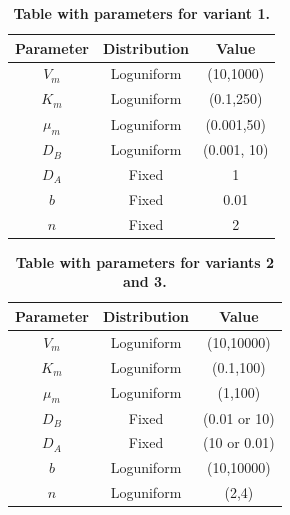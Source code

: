 \documentclass[10pt,letterpaper]{article}
\begin{document}
\begin{table}[!h]
    \centering
    \label{tab:sup_table1}
    \renewcommand{\arraystretch}{1.3} %
    \begin{tabular}{|c|c|c|}
        \hline
        \textbf{Parameter} & \textbf{Distribution} & \textbf{Value}\\
        \hline
        $V_{m}$ & Loguniform & (10,1000)\\
        \hline
        $K_{m}$ & Loguniform & (0.1,250)\\
        \hline
        $\mu_{m}$ & Loguniform & (0.001,50)\\
        \hline
        $D_{B}$ & Loguniform & (0.001, 10)\\
        \hline
        $D_{A}$ & Fixed & 1\\
        \hline
        $b$ & Fixed & 0.01\\
        \hline
        $n$ & Fixed & 2\\
        \hline
    \end{tabular}
    \caption{\textbf{Table with parameters for variant 1.} }
\end{table}


\begin{table}[!h]
    \centering
    \label{tab:sup_table2}
    \renewcommand{\arraystretch}{1.3} %
    \begin{tabular}{|c|c|c|}
        \hline
        \textbf{Parameter} & \textbf{Distribution} & \textbf{Value}\\
        \hline
        $V_{m}$ & Loguniform & (10,10000)\\
        \hline
        $K_{m}$ & Loguniform & (0.1,100)\\
        \hline
        $\mu_{m}$ & Loguniform & (1,100)\\
        \hline
        $D_{B}$ & Fixed & (0.01 or 10)\\
        \hline
        $D_{A}$ & Fixed & (10 or 0.01)\\
        \hline
        $b$ & Loguniform & (10,10000)\\
        \hline
        $n$ & Loguniform & (2,4)\\
        \hline
    \end{tabular}
    \caption{\textbf{Table with parameters for variants 2 and 3.} }
\end{table}
\end{document}
